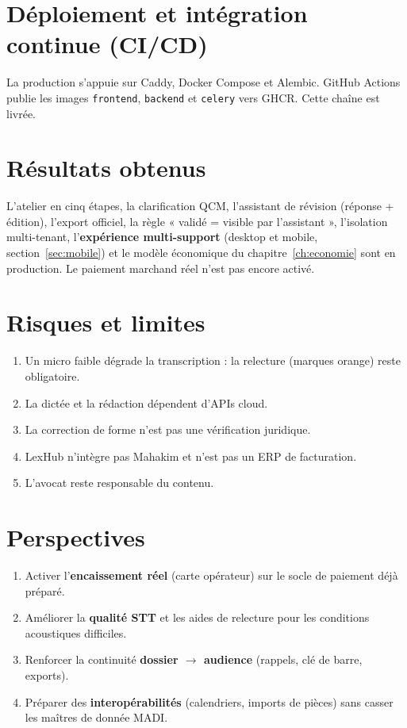 \section{Déploiement et intégration continue (CI/CD)}
\label{sec:cicd}

La production s'appuie sur Caddy, Docker Compose et Alembic. GitHub Actions publie les images \texttt{frontend}, \texttt{backend} et \texttt{celery} vers GHCR. Cette chaîne est livrée.

\section{Résultats obtenus}

L'atelier en cinq étapes, la clarification QCM, l'assistant de révision (réponse + édition), l'export officiel, la règle « validé = visible par l'assistant », l'isolation multi-tenant, l'\textbf{expérience multi-support} (desktop et mobile, section~\ref{sec:mobile}) et le modèle économique du chapitre~\ref{ch:economie} sont en production. Le paiement marchand réel n'est pas encore activé.

\section{Risques et limites}
\label{sec:limites}

\begin{enumerate}[leftmargin=1.4em]
  \item Un micro faible dégrade la transcription : la relecture (marques orange) reste obligatoire.
  \item La dictée et la rédaction dépendent d'APIs cloud.
  \item La correction de forme n'est pas une vérification juridique.
  \item LexHub n'intègre pas Mahakim et n'est pas un ERP de facturation.
  \item L'avocat reste responsable du contenu.
\end{enumerate}

\section{Perspectives}
\label{sec:perspectives}

\begin{enumerate}[leftmargin=1.4em]
  \item Activer l'\textbf{encaissement réel} (carte opérateur) sur le socle de paiement déjà préparé.
  \item Améliorer la \textbf{qualité STT} et les aides de relecture pour les conditions acoustiques difficiles.
  \item Renforcer la continuité \textbf{dossier $\rightarrow$ audience} (rappels, clé de barre, exports).
  \item Préparer des \textbf{interopérabilités} (calendriers, imports de pièces) sans casser les maîtres de donnée MADI.
\end{enumerate}
